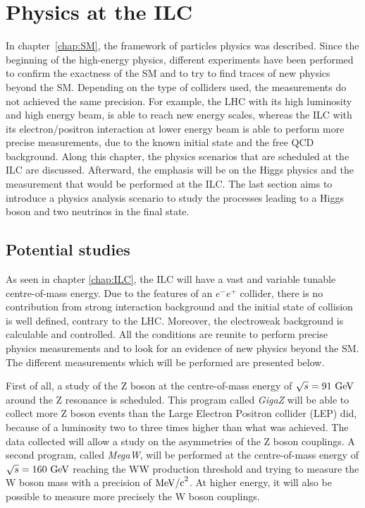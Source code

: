 \chapter{Physics at the ILC}
\label{chap:phyics}

  In chapter~\ref{chap:SM}, the framework of particles physics was described. 
  Since the beginning of the high-energy physics, different experiments have been performed to confirm the exactness of the \acrfull{SM} and to try to find traces of new physics beyond the \gls{SM}.
  Depending on the type of colliders used, the measurements do not achieved the same precision. 
  For example, the \gls{LHC} with its high luminosity and high energy beam, is able to reach new energy scales, whereas the \gls{ILC} with its electron/positron interaction at lower energy beam is able to perform more precise measurements, due to the known initial state and the free \gls{QCD} background. 
  Along this chapter, the physics scenarios that are scheduled at the \gls{ILC} are discussed. 
  Afterward, the emphasis will be on the Higgs physics and the measurement that would be performed at the \gls{ILC}. 
  The last section aims to introduce a physics analysis scenario to study the processes leading to a Higgs boson and two neutrinos in the final state.
 
 \minitoc

  \section{Potential studies}

  As seen in chapter \ref{chap:ILC}, the \gls{ILC} will have a vast and variable tunable centre-of-mass energy.
  Due to the features of an $e^-e^+$ collider, there is no contribution from strong interaction background and the initial state of collision is well defined, contrary to the \gls{LHC}.
  Moreover, the electroweak background is calculable and controlled.
  All the conditions are reunite to perform precise physics measurements and to look for an evidence of new physics beyond the \gls{SM}.
  The different measurements which will be performed are presented below.

   First of all, a study of the Z boson at the centre-of-mass energy of $\sqrt{s} = 91~\rm{GeV}$ around the Z resonance is scheduled. 
   This program called \textit{GigaZ} will be able to collect more Z boson events than the Large Electron Positron collider (LEP) did, because of a luminosity two to three times higher than what was achieved. 
   The data collected will allow a study on the asymmetries of the Z boson couplings. 
   A second program, called \textit{MegaW}, will be performed at the centre-of-mass energy of $\sqrt{s} = 160~\rm{GeV}$ reaching the WW production threshold and trying to measure the W boson mass with a precision of $\rm{MeV/c}^2$.
   At higher energy, it will also be possible to measure more precisely the W boson couplings.

